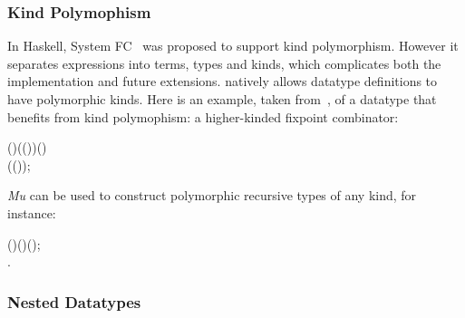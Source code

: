 \subsubsection{Kind Polymophism}
In Haskell, System FC~\cite{fc:pro}  
was proposed to support kind polymorphism. However it separates
expressions into terms, types and kinds, which complicates both the
implementation and future extensions. \sufcc natively allows datatype
definitions to have polymorphic kinds. Here is an example, taken
from~\cite{fc:pro}, of a datatype that benefits from kind polymophism:
a higher-kinded fixpoint combinator:
\begin{hscode}\SaveRestoreHook
{}%
%
%
%
\>[3]{}\;\;(\mathbin{:}\star)\;(\mathbin{:}(\to \star)\to {}\to \star)\;(\mathbin{:})\mathrel{=}{}\<[E]%
\\
\>[3]{}\<[5]%
\>[5]{}\;(\;(\;\;)\;);{}\<[E]%
\ColumnHook
\end{hscode}\resethooks
\emph{Mu} can be used to construct polymorphic recursive types of any kind, for instance:
\begin{hscode}\SaveRestoreHook
{}%
%
%
\>[3]{}\;\;(\mathbin{:}\star\to \star)\;(\mathbin{:}\star)\mathrel{=}\mid {}\;\;(\;);{}\<[E]%
\\
\>[3]{}\;\mathbin{:}\star\to \star\mathrel{=}\lambda {}\mathbin{:}\star.\,\star{}\;\<[E]%
\ColumnHook
\end{hscode}\resethooks
\subsubsection{Nested Datatypes}

